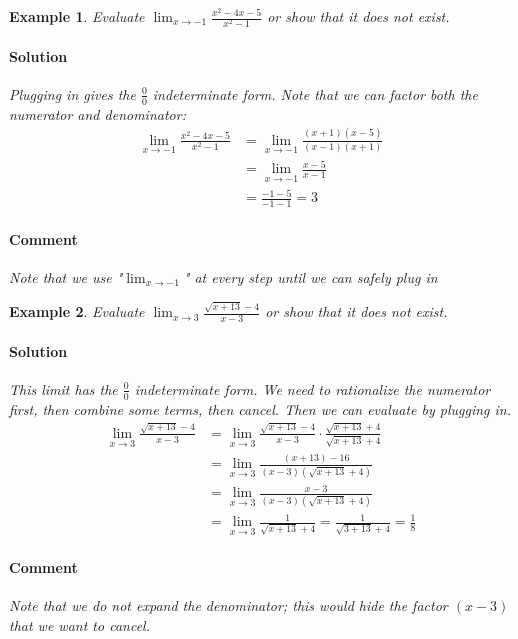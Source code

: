 \documentclass[letterpaper, 11pt, openany]{book}
\theoremstyle{mytheoremstyle}
\theoremstyle{myexamplestyle}
\newtheorem{example}{Example}[section]
\newenvironment{solution}{\paragraph{\sffamily \smaller \fontseries{b}\selectfont Solution}}{\hfill\faSquare}
\newenvironment{commentary}{\paragraph{\sffamily \smaller \fontseries{b}\selectfont Comment}}{}
\begin{document}
\begin{example}\label{e:limit-factoring}
    Evaluate $\displaystyle \lim_{x\to -1} \frac{x^{2} -4x  -5}{x^{2} - 1}$ or show that it does not exist.
    \begin{solution}
        Plugging in gives the $\frac{0}{0}$ indeterminate form. Note that we can factor both the numerator and denominator:
        \begin{align*}
            \lim_{x\to -1} \frac{x^{2} -4x  -5}{x^{2} - 1}  &= \lim_{x\to -1} \frac{(x+1)(x-5)}{(x-1)(x+1)}\\
                                                            &= \lim_{x\to -1} \frac{x - 5}{x - 1}\\
                                                            &= \frac{-1 - 5}{-1 -1} = 3
        \end{align*}
    \end{solution}
    \begin{commentary}
        \faExclamationTriangle[solid] \; Note that we use "$\displaystyle \lim_{x\to -1}$" at every step until we can safely plug in
    \end{commentary}
\end{example}

\begin{example}\label{e:limitrationalize}
    Evaluate $\displaystyle \lim_{x\to 3} \frac{\sqrt{x + 13} - 4}{x - 3}$ or show that it does not exist.
    \begin{solution}
        This limit has the $\frac{0}{0}$ indeterminate form. We need to rationalize the numerator first, then combine some terms, then cancel. Then we can evaluate by plugging in.
        \begin{align*}
            \lim_{x\to 3} \frac{\sqrt{x + 13} - 4}{x - 3}   &= \lim_{x\to 3} \frac{\sqrt{x + 13} - 4}{x - 3} \cdot \frac{\sqrt{x + 13} + 4}{\sqrt{x + 13} + 4} \\
                                                            &= \lim_{x\to 3} \frac{(x + 13) - 16}{(x-3)\left( \sqrt{x + 13} + 4 \right)}\\
                                                            &= \lim_{x\to 3} \frac{x - 3}{(x-3)\left( \sqrt{x + 13} + 4 \right)}\\
                                                            &= \lim_{x\to 3} \frac{1}{ \sqrt{x + 13} + 4} = \frac{1}{\sqrt{3 + 13} + 4} = \frac{1}{8}
        \end{align*}
    \end{solution}
    \begin{commentary}
        Note that we do not expand the denominator; this would hide the factor $(x - 3)$ that we want to cancel.
    \end{commentary}
\end{example}
\end{document}
